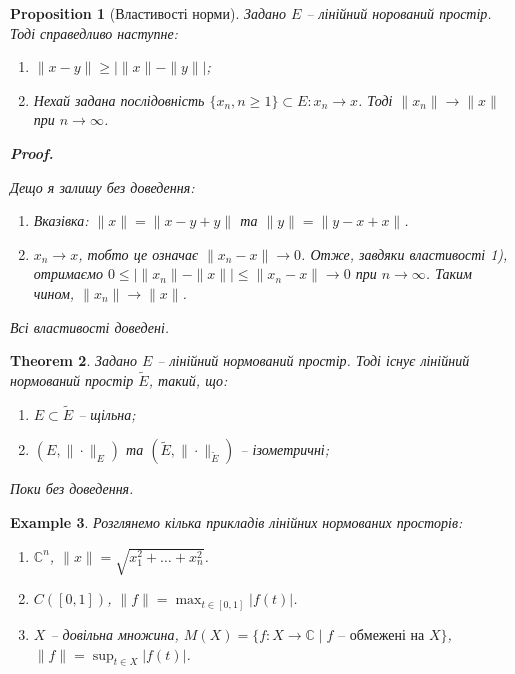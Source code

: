 \documentclass[a4paper, 10pt]{article}
\makeatletter
\theoremstyle{theoremdd}
\newtheorem{theorem}{Theorem}[subsection]
\newtheorem{example}[theorem]{Example}
\newtheorem{proposition}[theorem]{Proposition}
\renewenvironment{proof}[1][Proof.\\]{\par
\pushQED{\hfill \qed}%
\normalfont \topsep6\p@\@plus6\p@\relax
\trivlist
\item\relax
{\bfseries
#1\@addpunct{.}}\hspace\labelsep\ignorespaces
}{%
\popQED\endtrivlist\@endpefalse
}
\makeatother
\begin{document}
\begin{proposition}[Властивості норми]
Задано $E$ -- лінійний норований простір. Тоді справедливо наступне:
\begin{enumerate}[nosep,wide=0pt,label={\arabic*)}]
\item $\| x -y \| \geq \left| \|x\| - \|y\| \right|$;
\item Нехай задана послідовність $\{x_n, n \geq 1\} \subset E: x_n \to x$. Тоді $\| x_n \| \to \|x\|$ при $n \to \infty$.
\end{enumerate}

\begin{proof}
Дещо я залишу без доведення:
\begin{enumerate}[label={\arabic*)},wide=0pt]
\item \textit{Вказівка: $\|x\| = \|x-y+y\|$ та $\|y\| = \|y-x+x\|$.}
\item $x_n \to x$, тобто це означає $\|x_n - x\| \to 0$. Отже, завдяки властивості 1), отримаємо $0 \leq \left| \| x_n \| - \| x \| \right| \leq \|x_n-x\| \to 0$ при $n \to \infty$. Таким чином, $\| x_n \| \to \|x\|$.
\end{enumerate}
Всі властивості доведені.
\end{proof}
\end{proposition}

\begin{theorem}
Задано $E$ -- лінійний нормований простір. Тоді існує лінійний нормований простір $\tilde{E}$, такий, що:
\begin{enumerate}[nosep,wide=0pt,label={\arabic*)}]
\item $E \subset \tilde{E}$ -- щільна;
\item $(E, \| \cdot \|_E)$ та $(\tilde{E}, \| \cdot \|_{\tilde{E}})$ -- ізометричні;
\end{enumerate}
\textit{Поки без доведення.}
\end{theorem}

\begin{example}
Розглянемо кілька прикладів лінійних нормованих просторів:
\begin{enumerate}[nosep, wide=0pt, label={\arabic*)}]
\item $\mathbb{C}^n$, \qquad $\|x\| = \sqrt{x_1^2 + \dots + x_n^2}$.
\item $C([0,1])$, \qquad $\|f\| = \displaystyle\max_{t \in [0,1]} |f(t)|$.
\item $X$ -- довільна множина, $M(X) = \{f \colon X \to \mathbb{C} \mid f \text{ -- обмежені на } X \}$, \qquad $\|f\| = \displaystyle\sup_{t \in X} |f(t)|$.
\end{enumerate}
\end{example}
\end{document}

